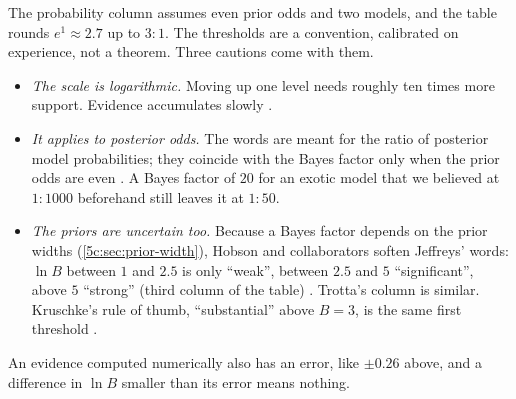 \noindent The probability column assumes even prior odds and two models, and the table
rounds $e^{1}\approx2.7$ up to $3:1$. The
thresholds are a convention, calibrated on experience, not a theorem. Three cautions
come with them.
\begin{itemize}[itemsep=1pt,leftmargin=1.2em]
  \item \emph{The scale is logarithmic.} Moving up one level needs roughly ten times
        more support. Evidence accumulates slowly \cite[p.~14]{Trotta2008}.
  \item \emph{It applies to posterior odds.} The words are meant for the ratio of
        posterior model probabilities; they coincide with the Bayes factor only when
        the prior odds are even . A Bayes factor of $20$
        for an exotic model that we believed at $1:1000$ beforehand still leaves it at
        $1:50$.
  \item \emph{The priors are uncertain too.} Because a Bayes factor depends on the
        prior widths (\cref{5c:sec:prior-width}), Hobson and collaborators soften
        Jeffreys' words: $\ln B$ between $1$ and $2.5$ is only ``weak'', between $2.5$ and
        $5$ ``significant'', above $5$ ``strong'' (third column of the table) .
        Trotta's column is similar. Kruschke's rule of thumb, ``substantial'' above $B=3$,
        is the same first threshold .
\end{itemize}
An evidence computed numerically also has an error, like $\pm0.26$ above, and a
difference in $\ln B$ smaller than its error means nothing.

